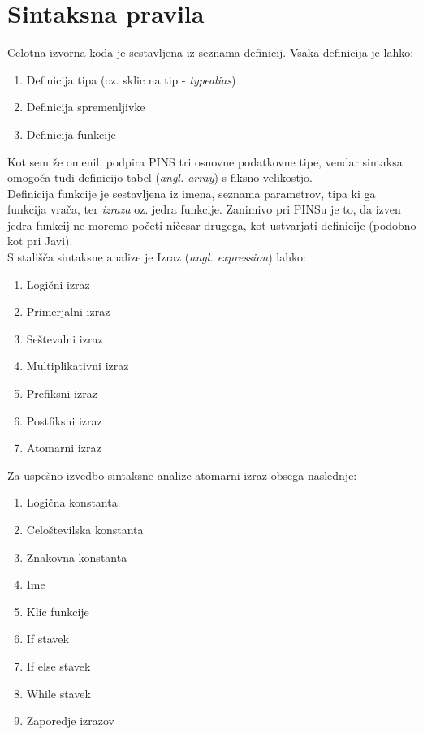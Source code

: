 \documentclass[a4paper, 12p]{book}
\begin{document}
\section{Sintaksna pravila}

Celotna izvorna koda je sestavljena iz seznama definicij. Vsaka definicija je lahko:

\begin{enumerate}
	\item Definicija tipa (oz. sklic na tip - \textit{typealias})
	\item Definicija spremenljivke
	\item Definicija funkcije
\end{enumerate}

Kot sem že omenil, podpira PINS tri osnovne podatkovne tipe, vendar sintaksa omogoča tudi definicijo tabel (\textit{angl. array}) s fiksno velikostjo. \\
\indent Definicija funkcije je sestavljena iz imena, seznama parametrov, tipa ki ga funkcija vrača, ter \textit{izraza} oz. jedra funkcije. Zanimivo pri PINSu je to, da izven jedra funkcij ne moremo početi ničesar drugega, kot ustvarjati definicije (podobno kot pri Javi). \\
\indent S stališča sintaksne analize je Izraz (\textit{angl. expression}) lahko:
\begin{enumerate}
	\item Logični izraz
	\item Primerjalni izraz
	\item Seštevalni izraz
	\item Multiplikativni izraz
	\item Prefiksni izraz
	\item Postfiksni izraz
	\item Atomarni izraz
\end{enumerate}

Za uspešno izvedbo sintaksne analize atomarni izraz obsega naslednje:
\begin{enumerate}
	\item Logična konstanta
	\item Celoštevilska konstanta
	\item Znakovna konstanta
	\item Ime
	\item Klic funkcije
	\item If stavek
	\item If else stavek
	\item While stavek
	\item Zaporedje izrazov
\end{enumerate}
\end{document}
